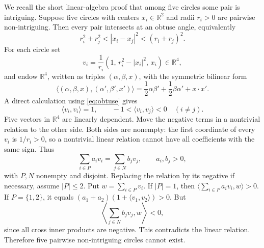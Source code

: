 \documentclass[12pt]{article}
\theoremstyle{plain}
\theoremstyle{definition}
\theoremstyle{remark}
\begin{document}
We recall the short linear-algebra proof that among five circles some pair is
intriguing.  Suppose five circles with centers \(x_i\in\mathbb R^2\) and radii
\(r_i>0\) are pairwise non-intriguing.  Then every pair intersects at an
obtuse angle, equivalently
\begin{equation}\label{eq:obtuse}
  r_i^2+r_j^2<|x_i-x_j|^2<(r_i+r_j)^2.
\end{equation}
For each circle set
\[
  v_i=\frac1{r_i}(1,\,r_i^2-|x_i|^2,\,x_i)\in\mathbb R^4,
\]
and endow \(\mathbb R^4\), written as triples \((\alpha,\beta,x)\), with the
symmetric bilinear form
\[
  \langle(\alpha,\beta,x),(\alpha',\beta',x')\rangle
  =\frac12\alpha\beta'+\frac12\beta\alpha'+x\cdot x'.
\]
A direct calculation using \eqref{eq:obtuse} gives
\[
  \langle v_i,v_i\rangle=1,
  \qquad
  -1<\langle v_i,v_j\rangle<0\quad(i\ne j).
\]
Five vectors in \(\mathbb R^4\) are linearly dependent.  Move the negative
terms in a nontrivial relation to the other side.  Both sides are nonempty:
the first coordinate of every \(v_i\) is \(1/r_i>0\), so a nontrivial linear
relation cannot have all coefficients with the same sign.  Thus
\[
  \sum_{i\in P}a_i v_i=\sum_{j\in N}b_j v_j,
  \qquad a_i,b_j>0,
\]
with \(P,N\) nonempty and disjoint.  Replacing the relation by its negative if
necessary, assume \(|P|\le2\).  Put \(w=\sum_{i\in P}v_i\).  If \(|P|=1\),
then \(\langle\sum_{i\in P}a_i v_i,w\rangle>0\).  If
\(P=\{1,2\}\), it equals
\((a_1+a_2)(1+\langle v_1,v_2\rangle)>0\).  But
\[
  \left\langle\sum_{j\in N}b_j v_j,w\right\rangle<0,
\]
since all cross inner products are negative.  This contradicts the linear
relation.  Therefore five pairwise non-intriguing circles cannot exist.
\end{document}

